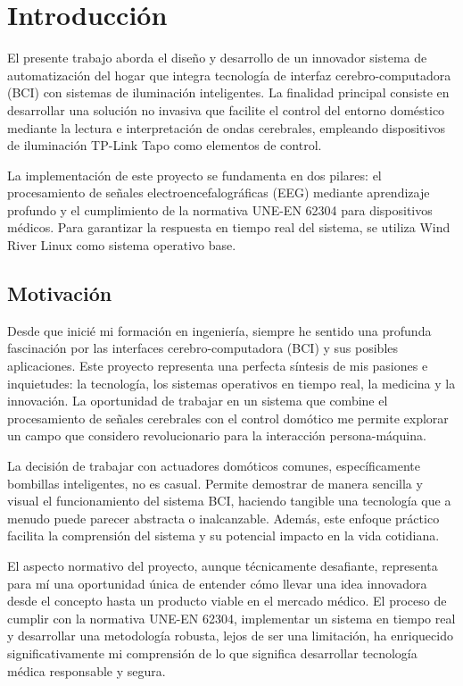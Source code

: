 \chapter{Introducción}

El presente trabajo aborda el diseño y desarrollo de un innovador sistema de automatización del hogar que integra tecnología de interfaz cerebro-computadora (BCI) con sistemas de iluminación inteligentes. La finalidad principal consiste en desarrollar una solución no invasiva que facilite el control del entorno doméstico mediante la lectura e interpretación de ondas cerebrales, empleando dispositivos de iluminación TP-Link Tapo como elementos de control.

La implementación de este proyecto se fundamenta en dos pilares: el procesamiento de señales electroencefalográficas (EEG) mediante aprendizaje profundo y el cumplimiento de la normativa UNE-EN 62304 para dispositivos médicos. Para garantizar la respuesta en tiempo real del sistema, se utiliza Wind River Linux como sistema operativo base.

\section{Motivación}
Desde que inicié mi formación en ingeniería, siempre he sentido una profunda fascinación por las interfaces cerebro-computadora (BCI) y sus posibles aplicaciones. Este proyecto representa una perfecta síntesis de mis pasiones e inquietudes: la tecnología, los sistemas operativos en tiempo real, la medicina y la innovación. La oportunidad de trabajar en un sistema que combine el procesamiento de señales cerebrales con el control domótico me permite explorar un campo que considero revolucionario para la interacción persona-máquina.

La decisión de trabajar con actuadores domóticos comunes, específicamente bombillas inteligentes, no es casual. Permite demostrar de manera sencilla y visual el funcionamiento del sistema BCI, haciendo tangible una tecnología que a menudo puede parecer abstracta o inalcanzable. Además, este enfoque práctico facilita la comprensión del sistema y su potencial impacto en la vida cotidiana.

El aspecto normativo del proyecto, aunque técnicamente desafiante, representa para mí una oportunidad única de entender cómo llevar una idea innovadora desde el concepto hasta un producto viable en el mercado médico. El proceso de cumplir con la normativa UNE-EN 62304, implementar un sistema en tiempo real y desarrollar una metodología robusta, lejos de ser una limitación, ha enriquecido significativamente mi comprensión de lo que significa desarrollar tecnología médica responsable y segura.

